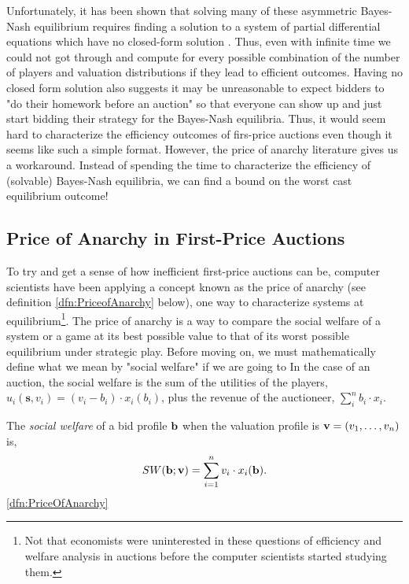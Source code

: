 \documentclass[12pt,twoside]{reedthesis}
\begin{document}
 Unfortunately, it has been shown that solving many of these asymmetric Bayes-Nash equilibrium requires finding a solution to a system of partial differential equations which have no closed-form solution \citep{Roughgarden2017}. Thus, even with infinite time we could not got through and compute for every possible combination of the number of players and valuation distributions if they lead to efficient outcomes. Having no closed form solution also suggests it may be unreasonable to expect bidders to "do their homework before an auction" so that everyone can show up and just start bidding their strategy for the Bayes-Nash equilibria. Thus, it would seem hard to characterize the efficiency outcomes of firs-price auctions even though it seems like such a simple format. However, the price of anarchy literature gives us a workaround. Instead of spending the time to characterize the efficiency of (solvable) Bayes-Nash equilibria, we can find a bound on the worst cast equilibrium outcome!

\subsection{Price of Anarchy in First-Price Auctions}  
To try and get a sense of how inefficient first-price auctions can be, computer scientists have been applying a concept known as the price of anarchy (see definition \ref{dfn:PriceofAnarchy} below), one way to characterize systems at equilibrium\footnote{Not that economists were uninterested in these questions of efficiency and welfare analysis in auctions before the computer scientists started studying them.}. The price of anarchy is a way to compare the social welfare of a system or a game at its best possible value to that of its worst possible equilibrium under strategic play. Before moving on, we must mathematically define what we mean by "social welfare" if we are going to  In the case of an auction, the social welfare is the sum of the utilities of the players, $u_i(\textbf{s}, v_i) = (v_i - b_i) \cdot x_i(b_i)$, plus the revenue of the auctioneer, $\sum_{i}^{n} b_i \cdot x_i$. 

\begin{dfn}
	The \textit{social welfare} of a bid profile $\textbf{b}$ when the valuation profile is $\textbf{v} = (v_1, \ldots, v_n)$ is, 
	$$ SW(\textbf{b};\textbf{v}) = \sum_{i=1}^{n} v_i \cdot x_i (\textbf{b}).$$
	\label{dfn:SocialWelfare}
	\ref{dfn:PriceOfAnarchy}
\end{dfn}
\end{document}
